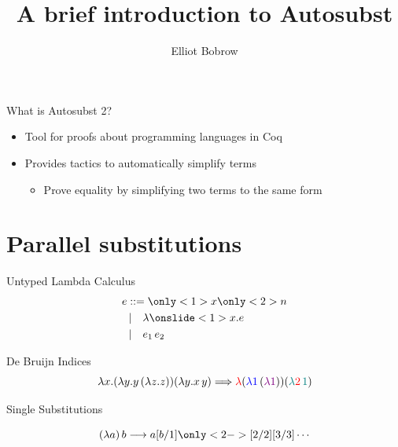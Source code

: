 \documentclass[17pt,aspectratio=169]{beamer}
\title{A brief introduction to Autosubst}
\author{Elliot Bobrow}
\institute{Advised by Stephanie Weirich and Yiyun Liu}
\date[\today]{}
\begin{document}
\begin{frame}
\titlepage
\end{frame}

\begin{frame}{What is Autosubst 2?}
    \begin{itemize}
        \item Tool for proofs about programming languages in Coq
        \item Provides tactics to automatically simplify terms
            \begin{itemize}
                \item Prove equality by simplifying two terms to the same form
            \end{itemize}
    \end{itemize}
\end{frame}

\section{Parallel substitutions}

\begin{frame}{Untyped Lambda Calculus}
    \begin{align*}
        e &::= \only<1>{x}\only<2>{n} \\
        &\,|\quad \lambda \onslide<1>{x.}e \\
        &\,|\quad e_1\, e_2
    \end{align*}
\end{frame}

\begin{frame}{De Bruijn Indices}
    \[
        \lambda x.(\lambda y. y\,(\lambda z.z)) (\lambda y.x\,y)
        \Longrightarrow
        \color{red}\lambda
        \color{black} (\color{blue}\lambda 1\color{black}\,(\color{violet}\lambda 1\color{black}))
        (\color{teal}\lambda \color{red}2\,\color{teal}1\color{black})
    \]
\end{frame}

\begin{frame}{Single Substitutions}

    \[
        (\lambda a)\,b \longrightarrow a[b/1]\only<2->{[2/2][3/3]\cdots}
    \]
\end{frame}
\end{document}
